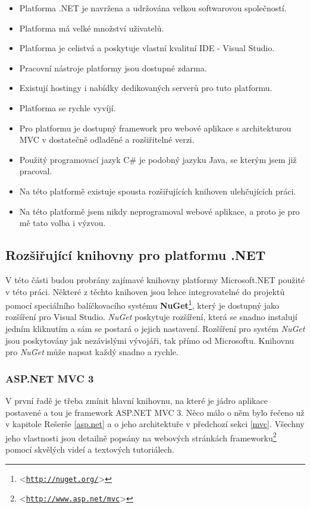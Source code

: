 \documentclass[11pt,twoside,a4paper]{book}
\let\oldUrl\url
\renewcommand\url[1]{<\texttt{\oldUrl{#1}}>}
\begin{document}
\begin{itemize}
\item Platforma .NET je navržena a udržována velkou softwarovou společností.
\item Platforma má velké množství uživatelů.
\item Platforma je celistvá a poskytuje vlastní kvalitní IDE - Visual Studio.
\item Pracovní nástroje platformy jsou dostupné zdarma.
\item Existují hostingy i nabídky dedikovaných serverů pro tuto platformu.
\item Platforma se rychle vyvíjí.
\item Pro platformu je dostupný framework pro webové aplikace s architekturou MVC v dostatečně odladěné a rozšiřitelné verzi.
\item Použitý programovací jazyk C\# je podobný jazyku Java, se kterým jsem již pracoval.
\item Na této platformě existuje spousta rozšiřujících knihoven ulehčujících práci.
\item Na této platformě jsem nikdy neprogramoval webové aplikace, a proto je pro mě tato volba i výzvou.
\end{itemize}


\subsection{Rozšiřující knihovny pro platformu .NET}
\label{subsec:roz}
V této části budou probrány zajímavé knihovny platformy Microsoft.NET použité v této práci. Některé z těchto knihoven jsou lehce integrovatelné do projektů pomocí speciálního balíčkovacího systému \textbf{NuGet}\footnote{\url{http://nuget.org/}}, který je dostupný jako rozšíření pro Visual Studio. \textit{NuGet} poskytuje rozšíření, která se snadno instalují jedním kliknutím a sám se postará o jejich nastavení. Rozšíření pro systém \textit{NuGet} jsou poskytovány jak nezávislými vývojáři, tak přímo od Microsoftu. Knihovnu pro \textit{NuGet} může napsat každý snadno a rychle.

\subsubsection{ASP.NET MVC 3}
V první řadě je třeba zmínit hlavní knihovnu, na které je jádro aplikace postavené a tou je framework ASP.NET MVC 3. Něco málo o něm bylo řečeno už v kapitole Rešerše \ref{asp.net} a o jeho architektuře v předchozí sekci \ref{mvc}. Všechny jeho vlastnosti jsou detailně popsány na webových stránkách frameworku\footnote{\url{http://www.asp.net/mvc}} pomocí skvělých videí a textových tutoriálech.
 
\end{document}
